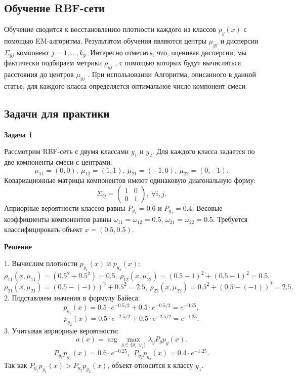 \subsection*{Обучение RBF-сети}

Обучение сводится к восстановлению плотности каждого из классов $p_y(x)$ с помощью EM-алгоритма. Результатом обучения являются центры $\mu _{yj}$ и дисперсии $\Sigma _{yj}$ компонент $j = 1, . . . , k_y$. Интересно отметить, что, оценивая дисперсии, мы фактически подбираем метрики $\rho _{yj}$ , с помощью которых будут вычисляться расстояния до центров $\mu _{yj}$ . При использовании Алгоритма, описанного в данной статье, для каждого класса определяется оптимальное число компонент смеси


\subsection*{Задачи для практики}

\textbf{Задача 1}

Рассмотрим RBF-сеть с двумя классами $ y_1 $ и $ y_2 $. Для каждого класса задается по две компоненты смеси с центрами:
\[
    \mu_{11} = (0, 0), \ \mu_{12} = (1, 1), \ \mu_{21} = (-1, 0), \ \mu_{22} = (0, -1).
\]
Ковариационные матрицы компонентов имеют одинаковую диагональную форму:
\[
    \Sigma_{ij} = \begin{pmatrix} 1 & 0 \\
                0 & 1\end{pmatrix}, \ \forall i, j.
\]
Априорные вероятности классов равны $ P_{y_1} = 0.6 $ и $ P_{y_2} = 0.4 $. Весовые коэффициенты компонентов равны $ \omega_{11} = \omega_{12} = 0.5 $, $ \omega_{21} = \omega_{22} = 0.5 $. Требуется классифицировать объект $ x = (0.5, 0.5) $.

\textbf{Решение}

1. Вычислим плотности $ p_{y_1}(x) $ и $ p_{y_2}(x) $:
\[
    \rho_{11}(x, \mu_{11}) = (0.5^2 + 0.5^2) = 0.5, \ \rho_{12}(x, \mu_{12}) = (0.5 - 1)^2 + (0.5 - 1)^2 = 0.5.
\]
\[
    \rho_{21}(x, \mu_{21}) = (0.5 - (-1))^2 + 0.5^2 = 2.5, \ \rho_{22}(x, \mu_{22}) = 0.5^2 + (0.5 - (-1))^2 = 2.5.
\]
2. Подставляем значения в формулу Байеса:
\[
    p_{y_1}(x) = 0.5 \cdot e^{-0.5/2} + 0.5 \cdot e^{-0.5/2} = e^{-0.25},
\]
\[
    p_{y_2}(x) = 0.5 \cdot e^{-2.5/2} + 0.5 \cdot e^{-2.5/2} = e^{-1.25}.
\]
3. Учитывая априорные вероятности:
\[
    a(x) = \arg\max_{y \in \{y_1, y_2\}} \lambda_y P_y p_y(x).
\]
\[
    P_{y_1} p_{y_1}(x) = 0.6 \cdot e^{-0.25}, \ \ P_{y_2} p_{y_2}(x) = 0.4 \cdot e^{-1.25}.
\]
Так как $ P_{y_1} p_{y_1}(x) > P_{y_2} p_{y_2}(x) $, объект относится к классу $ y_1 $.

